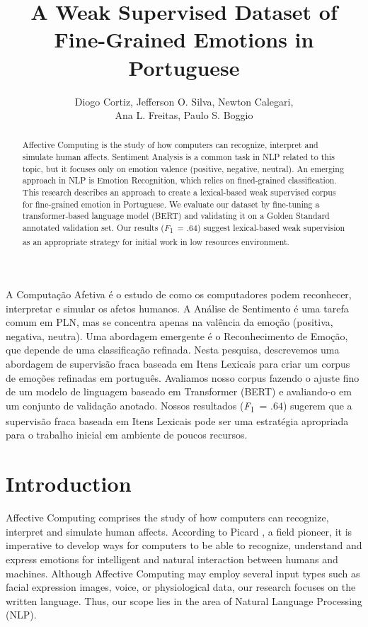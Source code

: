 \documentclass[12pt]{article}
\title{A Weak Supervised Dataset of Fine-Grained Emotions in Portuguese}
\author{Diogo Cortiz\inst{1,2}, Jefferson O. Silva\inst{2,4}, Newton Calegari\inst{2}, \\

Ana L. Freitas\inst{3}, Paulo S. Boggio\inst{3}}
\newcommand{\F}{\textit{F}\textsubscript{1}}
\begin{document}
\maketitle

\begin{abstract}
Affective Computing is the study of how computers can recognize, interpret and simulate human affects. Sentiment Analysis is a common task in NLP related to this topic, but it focuses only on emotion valence (positive, negative, neutral). An emerging approach in NLP is Emotion Recognition, which relies on fined-grained classification. This research describes an approach to create a lexical-based weak supervised corpus for fine-grained emotion in Portuguese. We evaluate our dataset by fine-tuning a transformer-based language model (BERT) and validating it on a Golden Standard annotated validation set. Our results (\F~= $.64$) suggest lexical-based weak supervision as an appropriate strategy for initial work in low resources environment.
\end{abstract}

\begin{resumo}
A Computação Afetiva é o estudo de como os computadores podem reconhecer, interpretar e simular os afetos humanos. A Análise de Sentimento é uma tarefa comum em PLN, mas se concentra apenas na valência da emoção (positiva, negativa, neutra). Uma abordagem emergente é o Reconhecimento de Emoção, que depende de uma classificação refinada. Nesta pesquisa, descrevemos uma abordagem de supervisão fraca baseada em Itens Lexicais para criar um corpus de emoções refinadas em português. Avaliamos nosso corpus fazendo o ajuste fino de um modelo de linguagem baseado em Transformer (BERT) e avaliando-o em um conjunto de validação anotado. Nossos resultados (\F~= $.64$) sugerem que a supervisão fraca baseada em Itens Lexicais pode ser uma estratégia apropriada para o trabalho inicial em ambiente de poucos recursos.

\end{resumo}

\section{Introduction}
\label{sec:introduction}

Affective Computing comprises the study of how computers can recognize, interpret and simulate human affects. According to Picard \cite{Rosalind2000}, a field pioneer, it is imperative to develop ways for computers to be able to recognize, understand and express emotions for intelligent and natural interaction between humans and machines. Although Affective Computing may employ several input types such as facial expression images, voice, or physiological data, our research focuses on the written language. Thus, our scope lies in the area of Natural Language Processing (NLP).
\end{document}
